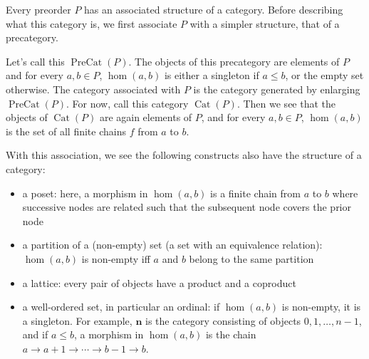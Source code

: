 \documentclass[12pt]{article}
\begin{document}
Every preorder $P$ has an associated structure of a category.  Before describing what this category is, we first associate $P$ with a simpler structure, that of a precategory.  

Let's call this $\operatorname{PreCat}(P)$.  The objects of this precategory are elements of $P$ and for every $a,b\in P$, $\hom(a,b)$ is either a singleton if $a\le b$, or the empty set otherwise.  The category associated with $P$ is the category generated by enlarging $\operatorname{PreCat}(P)$.  For now, call this category $\operatorname{Cat}(P)$.  Then we see that the objects of $\operatorname{Cat}(P)$ are again elements of $P$, and for every $a,b\in P$, $\hom(a,b)$ is the set of all finite chains $f$ from $a$ to $b$.

With this association, we see the following constructs also have the structure of a category:

\begin{itemize}
\item a poset: here, a morphism in $\hom(a,b)$ is a finite chain from $a$ to $b$ where successive nodes are related such that the subsequent node covers the prior node
\item a partition of a (non-empty) set (a set with an equivalence relation): $\hom(a,b)$ is non-empty iff $a$ and $b$ belong to the same partition
\item a lattice: every pair of objects have a product and a coproduct
\item a well-ordered set, in particular an ordinal: if $\hom(a,b)$ is non-empty, it is a singleton.  For example, $\textbf{n}$ is the category consisting of objects $0,1,\ldots,n-1$, and if $a\le b$, a morphism in $\hom(a,b)$ is the chain $a\to a+1 \to \cdots \to b-1 \to b$.
\end{itemize}
\end{document}

